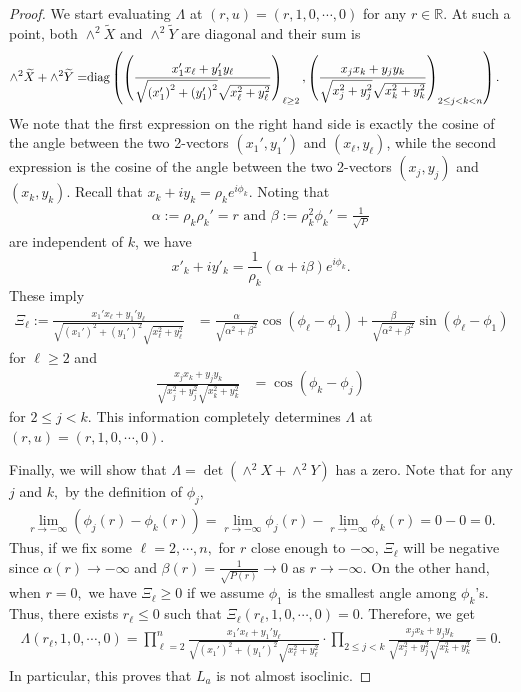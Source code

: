 \documentclass[11pt]{amsart}
\numberwithin{equation}{section}
\theoremstyle{definition}
\theoremstyle{definition}
\newcommand{\pr}[1]{\left(#1\right)}
\newcommand{\bb}[1]{\mathbb{#1}} \newcommand{\td}[1]{\widetilde{#1}}
\begin{document}
\begin{proof}
	We start evaluating $\Lambda$ at $(r,u)=(r,1,0,\cdots,0)$ for any $r\in\bb R.$
	At such a point, both $\wedge^2 \td X$ and $\wedge^2\td Y$ are diagonal and their sum is 
	\begin{align*}
	\wedge^2 \td X + \wedge^2 \td Y
	=&{\rm diag}\pr{
		\pr{\frac{x_1'x_\ell + y_1'y_\ell}
			{\sqrt{\pr{x_1'}^2 + \pr{y_1'}^2}\sqrt{x_\ell^2+y_\ell^2}}
		}_{\ell\ge 2},
		\pr{\frac{x_jx_k + y_jy_k}
			{\sqrt{x_j^2+y_j^2}\sqrt{x_k^2+y_k^2}}}_{2\le j<k<n}
	}.
	\end{align*}
    We note that the first expression on the right hand side is exactly the cosine of the angle between the two 2-vectors $(x_1', y_1')$ and $(x_\ell, y_\ell)$, while the second expression is the cosine of the angle between the two 2-vectors $(x_j, y_j)$ and $(x_k, y_k)$.
	Recall that $x_k+iy_k=\rho_ke^{i\phi_k}$.  
    Noting that
	\begin{align*}
	\alpha:=\rho_k\rho_k'=r\text{ and }
	\beta:=\rho_k^2\phi_k'
	= \frac 1{\sqrt P}
	\end{align*}
	are independent of $k$, we have 
    \[x'_k+iy'_k=\frac{1}{\rho_k}(\alpha+i\beta)e^{i\phi_k}.\]
	These imply
	\begin{align*}
	\Xi_\ell
    :=\frac{x_1'x_\ell + y_1'y_\ell}
	{\sqrt{\pr{x_1'}^2 + \pr{y_1'}^2}\sqrt{x_\ell^2+y_\ell^2}}
	& = 	\frac\alpha{\sqrt{\alpha^2+\beta^2}} \cos(\phi_\ell-\phi_1) + \frac\beta{\sqrt{\alpha^2+\beta^2}} \sin(\phi_\ell-\phi_1)
	\end{align*}
	for $\ell\ge 2$ and
	\begin{align*}
	\frac{x_jx_k + y_jy_k}
	{\sqrt{x_j^2+y_j^2}\sqrt{x_k^2+y_k^2}}
	& = \cos\pr{\phi_k-\phi_j}
	\end{align*}
	for $2\le j<k.$
	This information completely determines $\Lambda$ at $(r,u)=(r,1,0,\cdots,0).$
	
	Finally, we will show that $\Lambda=\det\pr{\wedge^2X + \wedge^2Y}$ has a zero.
	Note that for any $j$ and $k,$ by the definition of $\phi_j,$
	\begin{align*}
	\lim_{r\to-\infty}\pr{\phi_j(r)-\phi_k(r)} 
	= \lim_{r\to-\infty}\phi_j(r)
	- \lim_{r\to-\infty}\phi_k(r)
	=0-0=0.
	\end{align*} 
	Thus, if we fix some $\ell=2,\cdots,n,$ for $r$ close enough to $-\infty$,
	$\Xi_\ell$ will be negative since $\alpha(r)\to-\infty$ and $\beta(r) = \frac 1{\sqrt{P(r)}}\to 0$ as $r\to-\infty.$
	On the other hand, when $r=0,$ we have $\Xi_\ell\ge 0$
	if we assume $\phi_1$ is the smallest angle among $\phi_k$'s.
	Thus, there exists $r_\ell \le 0$ such that $\Xi_\ell(r_\ell,1,0,\cdots,0)=0.$
	Therefore, we get
	\begin{align*}
	\Lambda(r_\ell,1,0,\cdots,0)
	= \prod_{\ell=2}^n 
	\frac{x_1'x_\ell + y_1'y_\ell}
	{\sqrt{\pr{x_1'}^2 + \pr{y_1'}^2}\sqrt{x_\ell^2+y_\ell^2}}
	\cdot \prod_{2\le j<k}
	\frac{x_jx_k + y_jy_k}
	{\sqrt{x_j^2+y_j^2}\sqrt{x_k^2+y_k^2}}
	= 0.
	\end{align*}
	In particular, this proves that $L_a$ is not almost isoclinic.
\end{proof}
\end{document}
